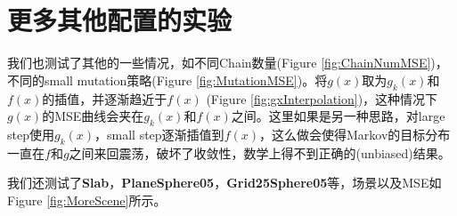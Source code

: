 \section{更多其他配置的实验}
\label{sec:otherConfig}
我们也测试了其他的一些情况，如不同Chain数量(Figure \ref{fig:ChainNumMSE})，不同的small mutation策略(Figure \ref{fig:MutationMSE})。将$g(x)$取为$g_k(x)$和$f(x)$的插值，并逐渐趋近于$f(x)$ (Figure \ref{fig:gxInterpolation})，这种情况下$g(x)$的MSE曲线会夹在$g_k(x)$和$f(x)$之间。这里如果是另一种思路，对large step使用$g_k(x)$，small step逐渐插值到$f(x)$，这么做会使得Markov的目标分布一直在$f$和$g$之间来回震荡，破坏了收敛性，数学上得不到正确的(unbiased)结果。

我们还测试了\textbf{Slab}，\textbf{PlaneSphere05}，\textbf{Grid25Sphere05}等，场景以及MSE如Figure \ref{fig:MoreScene}所示。

